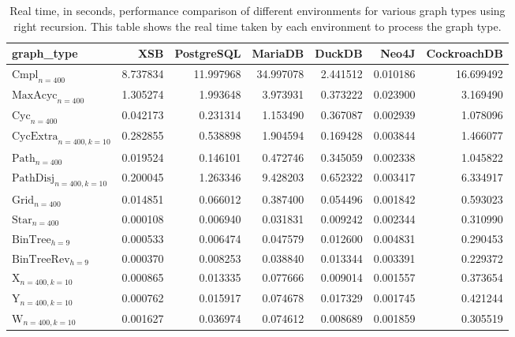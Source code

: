 \begin{table}
\caption{Real time, in seconds, performance comparison of different environments for various graph types using right recursion. This table shows the real time taken by each environment to process the graph type.}
\label{table:results}
\begin{tabular}{lrrrrrr}
\toprule
graph_type & XSB & PostgreSQL & MariaDB & DuckDB & Neo4J & CockroachDB \\
\midrule
$\text{Cmpl}_{n=400}$ & 8.737834 & 11.997968 & 34.997078 & 2.441512 & 0.010186 & 16.699492 \\
$\text{MaxAcyc}_{n=400}$ & 1.305274 & 1.993648 & 3.973931 & 0.373222 & 0.023900 & 3.169490 \\
$\text{Cyc}_{n=400}$ & 0.042173 & 0.231314 & 1.153490 & 0.367087 & 0.002939 & 1.078096 \\
$\text{CycExtra}_{n=400,k=10}$ & 0.282855 & 0.538898 & 1.904594 & 0.169428 & 0.003844 & 1.466077 \\
$\text{Path}_{n=400}$ & 0.019524 & 0.146101 & 0.472746 & 0.345059 & 0.002338 & 1.045822 \\
$\text{PathDisj}_{n=400,k=10}$ & 0.200045 & 1.263346 & 9.428203 & 0.652322 & 0.003417 & 6.334917 \\
$\text{Grid}_{n=400}$ & 0.014851 & 0.066012 & 0.387400 & 0.054496 & 0.001842 & 0.593023 \\
$\text{Star}_{n=400}$ & 0.000108 & 0.006940 & 0.031831 & 0.009242 & 0.002344 & 0.310990 \\
$\text{BinTree}_{h=9}$ & 0.000533 & 0.006474 & 0.047579 & 0.012600 & 0.004831 & 0.290453 \\
$\text{BinTreeRev}_{h=9}$ & 0.000370 & 0.008253 & 0.038840 & 0.013344 & 0.003391 & 0.229372 \\
$\text{X}_{n=400, k=10}$ & 0.000865 & 0.013335 & 0.077666 & 0.009014 & 0.001557 & 0.373654 \\
$\text{Y}_{n=400,k=10}$ & 0.000762 & 0.015917 & 0.074678 & 0.017329 & 0.001745 & 0.421244 \\
$\text{W}_{n=400,k=10}$ & 0.001627 & 0.036974 & 0.074612 & 0.008689 & 0.001859 & 0.305519 \\
\bottomrule
\end{tabular}
\end{table}
